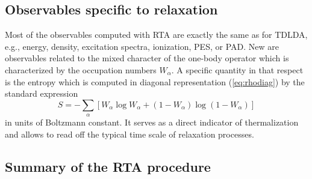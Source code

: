 \documentclass[final,1p]{elsarticle}
\begin{document}
\subsection{Observables specific to relaxation}

Most of the observables computed with RTA are exactly the same as for
TDLDA, e.g., energy, density, excitation spectra, ionization, PES, or PAD.
New are observables related to the mixed character of the
one-body operator which is characterized by the occupation
numbers $W_\alpha$. 
A specific quantity in that respect is the 
entropy which is computed in diagonal representation
(\ref{eq:rhodiag}) by the standard expression \cite{Rei98aB}
\begin{equation}
  S
  =
  - \sum_\alpha\left[
    W_\alpha\log W_\alpha
    +
    (1\!-\!W_\alpha)\log (1\!-\!W_\alpha)
  \right]
\label{eq:entropy}
\end{equation}
in units of Boltzmann constant. 
It serves as a direct indicator of thermalization and allows to 
read off the typical time scale of relaxation processes. 



\subsection{Summary of the RTA procedure}
\label{sec:summaryRTA}
\end{document}
